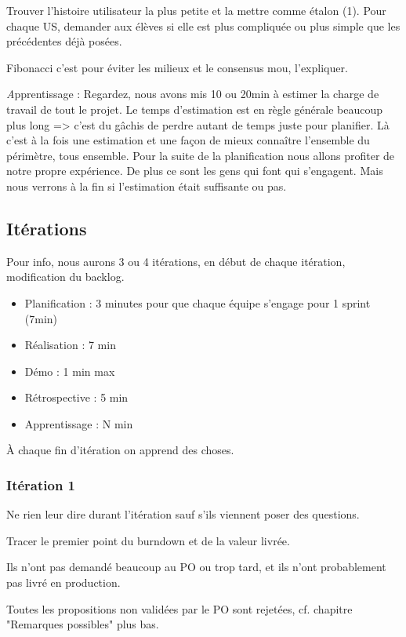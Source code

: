 \documentclass[a4paper,12pt]{article}
\newcommand{\prof}[1]{\textit #1}
\begin{document}
Trouver l'histoire utilisateur la plus petite et la mettre comme étalon (1). Pour chaque US, demander aux élèves si elle est plus compliquée ou plus simple que les précédentes déjà posées.

Fibonacci c'est pour éviter les milieux et le consensus mou, l'expliquer.

\prof{Apprentissage : Regardez, nous avons mis 10 ou 20min à estimer la charge de travail de tout le projet. Le temps d'estimation est en règle générale beaucoup plus long => c'est du gâchis de perdre autant de temps juste pour planifier. Là c'est à la fois une estimation et une façon de mieux connaître l'ensemble du périmètre, tous ensemble. Pour la suite de la planification nous allons profiter de notre propre expérience. De plus ce sont les gens qui font qui s'engagent. Mais nous verrons à la fin si l'estimation était suffisante ou pas.}

\subsection{Itérations}
Pour info, nous aurons 3 ou 4 itérations, en début de chaque itération, modification du backlog.

\begin{itemize}
  \item Planification : 3 minutes pour que chaque équipe s'engage pour 1 sprint (7min)
  \item Réalisation : 7 min
  \item Démo : 1 min max
  \item Rétrospective : 5 min
  \item Apprentissage : N min
\end{itemize}

À chaque fin d'itération on apprend des choses.
\subsubsection{Itération 1}
Ne rien leur dire durant l'itération sauf s'ils viennent poser des questions.

Tracer le premier point du burndown et de la valeur livrée.

Ils n'ont pas demandé beaucoup au PO ou trop tard, et ils n'ont probablement pas livré en production.

Toutes les propositions non validées par le PO sont rejetées, cf. chapitre "Remarques possibles" plus bas.
\end{document}
